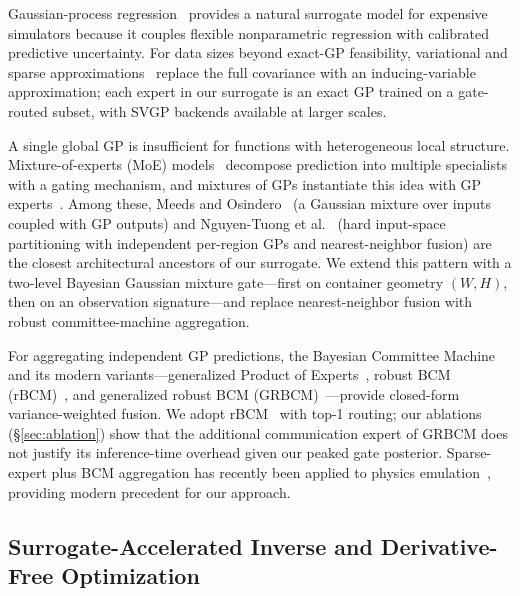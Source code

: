 Gaussian-process regression~\cite{rasmussen2006gaussian} provides a
natural surrogate model for expensive simulators because it couples
flexible nonparametric regression with calibrated predictive
uncertainty. For data sizes beyond exact-GP feasibility, variational and
sparse approximations~\cite{snelson2006sparse,quinonero2005unifying,
titsias2009variational,hensman2013gaussian,matthews2016sparse} replace
the full covariance with an inducing-variable approximation; each expert
in our surrogate is an exact GP trained on a gate-routed subset, with
SVGP backends available at larger scales.

A single global GP is insufficient for functions with heterogeneous
local structure. Mixture-of-experts (MoE)
models~\cite{jordan1994hierarchical,yuksel2012twenty} decompose
prediction into multiple specialists with a gating mechanism, and
mixtures of GPs instantiate this idea with GP
experts~\cite{tresp2001mixtures,rasmussen2002infinite,
meeds2006alternative,nguyen2008local,yuan2008variational,trapp2020deep}.
Among these, Meeds and Osindero~\cite{meeds2006alternative} (a Gaussian
mixture over inputs coupled with GP outputs) and Nguyen-Tuong et
al.~\cite{nguyen2008local} (hard input-space partitioning with
independent per-region GPs and nearest-neighbor fusion) are the closest
architectural ancestors of our surrogate. We extend this pattern with a
two-level Bayesian Gaussian mixture gate---first on container geometry
$(W, H)$, then on an observation signature---and replace
nearest-neighbor fusion with robust committee-machine aggregation.

For aggregating independent GP predictions, the Bayesian Committee
Machine~\cite{tresp2000bayesian} and its modern variants---generalized
Product of Experts~\cite{cao2014generalized}, robust BCM
(rBCM)~\cite{deisenroth2015distributed}, and generalized robust BCM
(GRBCM)~\cite{liu2018generalized}---provide closed-form
variance-weighted fusion. We adopt
rBCM~\cite{deisenroth2015distributed} with top-1 routing; our ablations
(\S\ref{sec:ablation}) show that the additional communication expert of
GRBCM does not justify its inference-time overhead given our peaked
gate posterior. Sparse-expert plus BCM aggregation has recently been
applied to physics emulation~\cite{cohen2024sparse}, providing modern
precedent for our approach.


\subsection{Surrogate-Accelerated Inverse and Derivative-Free Optimization}

